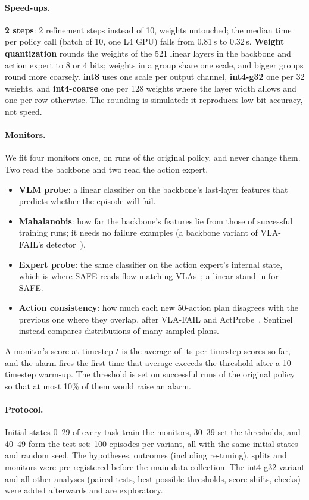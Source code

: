 \documentclass{article}
\begin{document}
\paragraph{Speed-ups.} \textbf{2 steps}: 2 refinement steps instead of 10, weights untouched; the
median time per policy call (batch of 10, one L4 GPU) falls from 0.81\,s to 0.32\,s.
\textbf{Weight quantization} rounds the weights of the 521 linear layers in the backbone and action
expert to 8 or 4 bits; weights
in a group share one scale, and bigger groups round more coarsely. \textbf{int8} uses one scale
per output channel, \textbf{int4-g32} one per 32 weights, and \textbf{int4-coarse} one per 128
weights where the layer width allows and one per row otherwise. The rounding is simulated: it
reproduces low-bit accuracy, not speed.

\paragraph{Monitors.} We fit four monitors once, on runs of the original policy, and never change
them. Two read the backbone and two read the action expert.
\begin{itemize}
  \item \textbf{VLM probe}: a linear classifier on the backbone's last-layer features that
  predicts whether the episode will fail.
  \item \textbf{Mahalanobis}: how far the backbone's features lie from those of successful
  training runs; it needs no failure examples (a backbone variant of VLA-FAIL's
  detector~\citep{vlafail}).
  \item \textbf{Expert probe}: the same classifier on the action expert's internal state, which is
  where SAFE reads flow-matching VLAs~\citep{safe}; a linear stand-in for SAFE.
  \item \textbf{Action consistency}: how much each new 50-action plan disagrees with the previous
  one where they overlap, after VLA-FAIL and ActProbe~\citep{vlafail,actprobe}.
  Sentinel~\citep{sentinel} instead compares distributions of many sampled plans.
\end{itemize}
A monitor's score at timestep $t$ is the average of its per-timestep scores so far, and the alarm
fires the first time that average exceeds the threshold after a 10-timestep warm-up. The
threshold is set on successful runs of the original policy so that at most 10\% of them would
raise an alarm.

\paragraph{Protocol.} Initial states 0--29 of every task train the monitors, 30--39 set the
thresholds, and 40--49 form the test set: 100 episodes per variant, all with the same initial
states and random seed. The hypotheses, outcomes (including re-tuning), splits and monitors were pre-registered
before the main data collection. The int4-g32 variant and all other analyses (paired tests, best
possible thresholds, score shifts, checks) were added afterwards and are exploratory.
\end{document}
